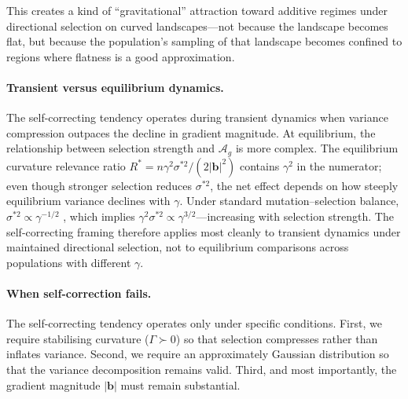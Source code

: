 \documentclass[9pt,twocolumn,twoside,lineno]{gsajnl}
\newcommand{\vect}[1]{\boldsymbol{#1}}
\newcommand{\Ag}{\ensuremath{\mathcal{A}_{g}}\xspace}
\begin{document}
This creates a kind of ``gravitational'' attraction toward additive regimes under directional selection on curved landscapes---not because the landscape becomes flat, but because the population's sampling of that landscape becomes confined to regions where flatness is a good approximation.

\paragraph{Transient versus equilibrium dynamics.}
The self-correcting tendency operates during transient dynamics when variance compression outpaces the decline in gradient magnitude. At equilibrium, the relationship between selection strength and \Ag is more complex. The equilibrium curvature relevance ratio $R^* = n\gamma^2\sigma^{*2}/(2|\vect{b}|^2)$ contains $\gamma^2$ in the numerator; even though stronger selection reduces $\sigma^{*2}$, the net effect depends on how steeply equilibrium variance declines with $\gamma$. Under standard mutation--selection balance, $\sigma^{*2} \propto \gamma^{-1/2}$ \citep{Lande1980, Turelli1984}, which implies $\gamma^2\sigma^{*2} \propto \gamma^{3/2}$---increasing with selection strength. The self-correcting framing therefore applies most cleanly to transient dynamics under maintained directional selection, not to equilibrium comparisons across populations with different $\gamma$.

\paragraph{When self-correction fails.}
The self-correcting tendency operates only under specific conditions. First, we require stabilising curvature ($\Gamma \succ 0$) so that selection compresses rather than inflates variance. Second, we require an approximately Gaussian distribution so that the variance decomposition remains valid. Third, and most importantly, the gradient magnitude $|\vect{b}|$ must remain substantial.
\end{document}
